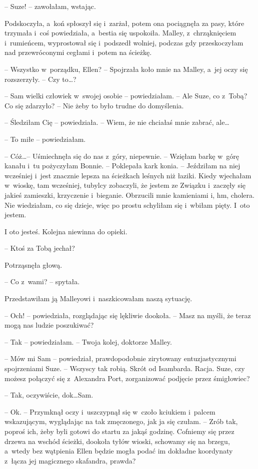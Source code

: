 \documentclass[oneside,polish,11pt,sfheadings]{mwbk}
\begin{document}
-- Suze! -- zawołałam, wstając.

Podskoczyła, a~koń spłoszył się i~zarżał, potem ona pociągnęła za pasy,
które trzymała i~coś powiedziała, a~bestia się uspokoiła. Malley, z~chrząknięciem i~rumieńcem, wyprostował się i~podszedł wolniej, podczas
gdy przeskoczyłam nad przewróconymi cegłami i~potem na ścieżkę.

-- Wszystko w~porządku, Ellen? -- Spojrzała koło mnie na Malley, a~jej
oczy się rozszerzyły. -- Czy to\ldots ?

-- Sam wielki człowiek w~swojej osobie -- powiedziałam. -- Ale Suze, co z~Tobą? Co się zdarzyło? -- Nie żeby to było trudne do domyślenia.

-- Śledziłam Cię -- powiedziała. -- Wiem, że nie chciałaś mnie zabrać,
ale\ldots 

-- To miłe -- powiedziałam.

-- Cóż\ldots  -- Uśmiechnęła się do nas z~góry, niepewnie. -- Wzięłam barkę w~górę kanału i~tu pożyczyłam Bonnie. -- Poklepała kark konia. -- Jeździłam
na niej wcześniej i~jest znacznie lepsza na ścieżkach leśnych niż
łaziki. Kiedy wjechałam w~wioskę, tam wcześniej, tubylcy zobaczyli, że
jestem ze Związku i~zaczęły się jakieś zamieszki, krzyczenie i~bieganie.
Obrzucili mnie kamieniami i, hm, cholera. Nie wiedziałam, co się dzieje,
więc po prostu schyliłam się i~wbiłam pięty. I~oto jestem.

I oto jesteś. Kolejna niewinna do opieki.

-- Ktoś za Tobą jechał?

Potrząsnęła głową. 

-- Co z~wami? -- spytała.

Przedstawiłam ją Malleyowi i~naszkicowałam naszą sytuację.

-- Och! -- powiedziała, rozglądając się lękliwie dookoła. -- Masz na myśli,
że teraz mogą nas ludzie poszukiwać?

-- Tak -- powiedziałam. -- Twoja kolej, doktorze Malley.

-- Mów mi Sam -- powiedział, prawdopodobnie zirytowany entuzjastycznymi
spojrzeniami Suze. -- Wszyscy tak robią. Skrót od Isambarda. Racja. Suze,
czy możesz połączyć się z~Alexandra Port, zorganizować podjęcie przez
śmigłowiec?

-- Tak, oczywiście, dok\ldots  Sam.

-- Ok. -- Przymknął oczy i~uszczypnął się w~czoło kciukiem i~palcem
wskazującym, wyglądając na tak zmęczonego, jak ja się czułam. -- Zrób
tak, poproś ich, żeby byli gotowi do startu za jakąś godzinę. Cofniemy
się przez drzewa na wschód ścieżki, dookoła tyłów wioski, schowamy się
na brzegu, a~wtedy bez wątpienia Ellen będzie mogła podać im dokładne
koordynaty z~łącza jej magicznego skafandra, prawda?
\end{document}
